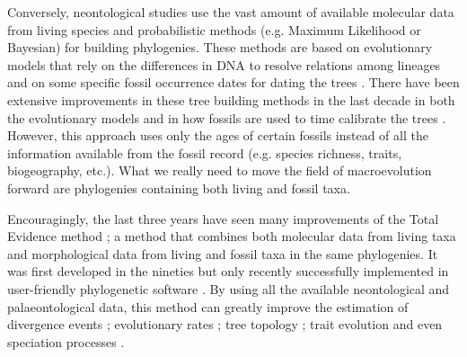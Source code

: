 Conversely, neontological studies use the vast amount of available molecular data from living species and probabilistic methods (e.g. Maximum Likelihood or Bayesian) for building phylogenies.
These methods are based on evolutionary models that rely on the differences in DNA to resolve relations among lineages and on some specific fossil occurrence dates for dating the trees \citep[i.e. the molecular clock;][]{zuckerkandl1965}.
There have been extensive improvements in these tree building methods in the last decade in both the evolutionary models \citep[e.g.][]{bapsta2013,stadlerdating2013,heaththe2013} and in how fossils are used to time calibrate the trees \citep{Donoghue2007424,Parham01032012}.
However, this approach uses only the ages of certain fossils instead of all the information available from the fossil record (e.g. species richness, traits, biogeography, etc.).
What we really need to move the field of macroevolution forward are phylogenies containing both living and fossil taxa.

Encouragingly, the last three years have seen many improvements of the Total Evidence method \citep{ronquista2012,slaterphylogenetic2013,Wood01032013,schragocombining2013,beckancient2014,Arcila2015131,Dembo2015}; a method that combines both molecular data from living taxa and morphological data from living and fossil taxa in the same phylogenies.
It was first developed in the nineties \citep{eernissetaxonomic1993} but only recently successfully implemented in user-friendly phylogenetic software \citep{Ronquist2012mrbayes,BEAST2}.
By using all the available neontological and palaeontological data, this method can greatly improve the estimation of divergence events \citep[e.g.][]{ronquista2012}; evolutionary rates \citep[e.g.][]{beckancient2014}; tree topology \citep[e.g.][]{Dembo2015}; trait evolution \citep[e.g.][]{slaterphylogenetic2013} and even speciation processes \citep[e.g.][]{Wood01032013}.



